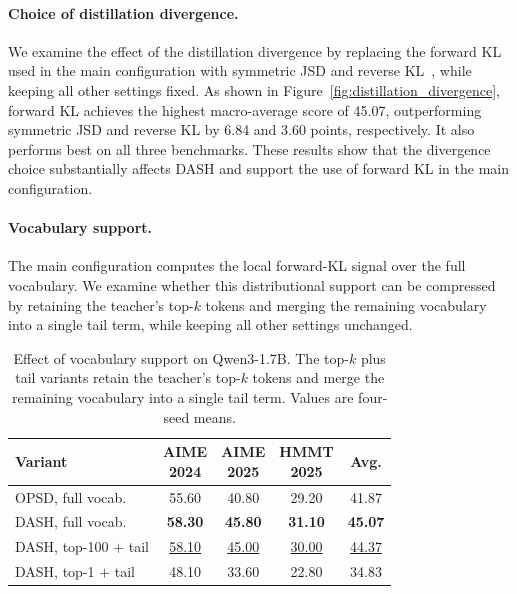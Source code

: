 \documentclass[letterpaper]{article} %
\begin{document}
\paragraph{Choice of distillation divergence.}
We examine the effect of the distillation divergence by replacing the
forward KL used in the main configuration with symmetric JSD and
reverse KL~\cite{agarwal2024onpolicy,gu2024minillm,ko2024distillm}, while keeping all other settings fixed. As shown in Figure~\ref{fig:distillation_divergence}, forward KL achieves the highest macro-average score of 45.07, outperforming symmetric JSD and reverse KL by 6.84 and 3.60 points, respectively. It also performs best on all three benchmarks. These results show that the divergence choice substantially affects DASH and support the use of forward KL in the main configuration.

\paragraph{Vocabulary support.}
The main configuration computes the local forward-KL signal over the
full vocabulary. We examine whether this distributional support can be
compressed by retaining the teacher's top-$k$ tokens and merging the
remaining vocabulary into a single tail term, while keeping all other
settings unchanged.

\begin{table}[t]
\centering
\small
\setlength{\tabcolsep}{2.7pt}
\begin{tabular}{@{}lcccc@{}}
\toprule
\textbf{Variant}
& \shortstack{\textbf{AIME}\\\textbf{2024}}
& \shortstack{\textbf{AIME}\\\textbf{2025}}
& \shortstack{\textbf{HMMT}\\\textbf{2025}}
& \textbf{Avg.} \\
\midrule
OPSD, full vocab.
& 55.60 & 40.80 & 29.20 & 41.87 \\
\midrule
DASH, full vocab.
& \textbf{58.30}
& \textbf{45.80}
& \textbf{31.10}
& \textbf{45.07} \\
DASH, top-100 $+$ tail
& \underline{58.10}
& \underline{45.00}
& \underline{30.00}
& \underline{44.37} \\
DASH, top-1 $+$ tail
& 48.10 & 33.60 & 22.80 & 34.83 \\
\bottomrule
\end{tabular}
\caption{Effect of vocabulary support on Qwen3-1.7B. The top-$k$ plus
tail variants retain the teacher's top-$k$ tokens and merge the
remaining vocabulary into a single tail term. Values are four-seed
means.}
\label{tab:vocabulary_support}
\end{table}
\end{document}
